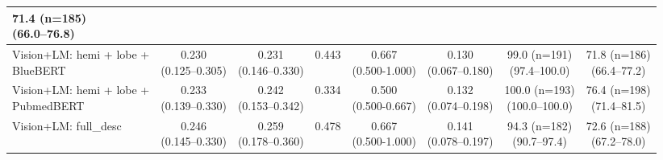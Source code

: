 \documentclass[FCD_GNN.tex]{subfiles}
\begin{document}
\begin{table}[ht]
\begin{threeparttable}
\begin{tabular}{lccccccc}
    \makecell{71.4 (n=185) \\ (66.0--76.8)} \\
    \hline
    Vision+LM: \makecell{hemi + lobe + \\ BlueBERT} &
    \makecell{0.230\\(0.125--0.305)} &
    \makecell{0.231\\(0.146--0.330)} &
    0.443 &
    \makecell{0.667 \\ (0.500-1.000)} &
    \makecell{0.130\\(0.067--0.180)} &
    \makecell{\colorbox{orange!15}{99.0 (n=191)} \\ (97.4--100.0)} &
    \makecell{71.8 (n=186) \\ (66.4--77.2)} \\
    \hline
    Vision+LM: \makecell{hemi + lobe + \\ PubmedBERT} &
    \makecell{0.233\\(0.139--0.330)} &
    \makecell{\colorbox{cyan!15}{0.242}\\(0.153--0.342)} &
    0.334 &
    \makecell{0.500 \\ (0.500-0.667)} &
    \makecell{0.132\\(0.074--0.198)} &
    \makecell{\colorbox{green!15}{100.0 (n=193)} \\ (100.0--100.0)} &
    \makecell{\colorbox{green!15}{76.4 (n=198)} \\ (71.4--81.5)} \\
    \hline
    Vision+LM: full\_desc &
    \makecell{0.246\\(0.145--0.330)} &
    \makecell{\colorbox{green!15}{0.259}\\(0.178--0.360)} &
    \colorbox{orange!15}{0.478} &
    \makecell{0.667 \\ (0.500-1.000)} &
    \makecell{0.141\\(0.078--0.197)} &
    \makecell{94.3 (n=182) \\ (90.7--97.4)} &
    \makecell{\colorbox{orange!15}{72.6 (n=188)} \\ (67.2--78.0)} \\
    
    \bottomrule
    \end{tabular}
    

\end{threeparttable}
\end{table}
\end{document}
